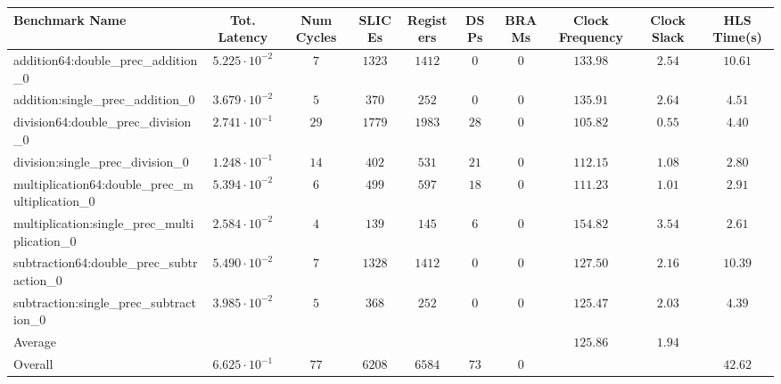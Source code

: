 \begin{tabular}{|l|c|c|c|c|c|c|c|c|c|}
\hline
Benchmark Name                                   & Tot. Latency            & Num Cycles & SLICEs   & Registers & DSPs   & BRAMs & Clock Frequency & Clock Slack & HLS Time(s) \\
\hline
addition64:double\_prec\_addition\_0             & $ 5.225 \cdot 10^{-2} $ & $ 7      $ & $ 1323 $ & $ 1412  $ & $ 0  $ & $ 0 $ & $ 133.98      $ & $ 2.54    $ & $ 10.61   $ \\
addition:single\_prec\_addition\_0               & $ 3.679 \cdot 10^{-2} $ & $ 5      $ & $ 370  $ & $ 252   $ & $ 0  $ & $ 0 $ & $ 135.91      $ & $ 2.64    $ & $ 4.51    $ \\
division64:double\_prec\_division\_0             & $ 2.741 \cdot 10^{-1} $ & $ 29     $ & $ 1779 $ & $ 1983  $ & $ 28 $ & $ 0 $ & $ 105.82      $ & $ 0.55    $ & $ 4.40    $ \\
division:single\_prec\_division\_0               & $ 1.248 \cdot 10^{-1} $ & $ 14     $ & $ 402  $ & $ 531   $ & $ 21 $ & $ 0 $ & $ 112.15      $ & $ 1.08    $ & $ 2.80    $ \\
multiplication64:double\_prec\_multiplication\_0 & $ 5.394 \cdot 10^{-2} $ & $ 6      $ & $ 499  $ & $ 597   $ & $ 18 $ & $ 0 $ & $ 111.23      $ & $ 1.01    $ & $ 2.91    $ \\
multiplication:single\_prec\_multiplication\_0   & $ 2.584 \cdot 10^{-2} $ & $ 4      $ & $ 139  $ & $ 145   $ & $ 6  $ & $ 0 $ & $ 154.82      $ & $ 3.54    $ & $ 2.61    $ \\
subtraction64:double\_prec\_subtraction\_0       & $ 5.490 \cdot 10^{-2} $ & $ 7      $ & $ 1328 $ & $ 1412  $ & $ 0  $ & $ 0 $ & $ 127.50      $ & $ 2.16    $ & $ 10.39   $ \\
subtraction:single\_prec\_subtraction\_0         & $ 3.985 \cdot 10^{-2} $ & $ 5      $ & $ 368  $ & $ 252   $ & $ 0  $ & $ 0 $ & $ 125.47      $ & $ 2.03    $ & $ 4.39    $ \\
\hline
Average                                          & $                     $ & $        $ & $      $ & $       $ & $    $ & $   $ & $ 125.86      $ & $ 1.94    $ & $         $ \\
\hline
Overall                                          & $ 6.625 \cdot 10^{-1} $ & $ 77     $ & $ 6208 $ & $ 6584  $ & $ 73 $ & $ 0 $ & $             $ & $         $ & $ 42.62   $ \\
\hline
\end{tabular}
